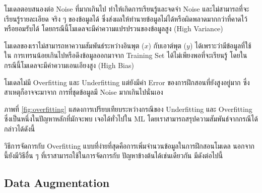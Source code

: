 \begin{description}[style=nextline]
    \item[Overfitting] โมเดลตอบสนองต่อ Noise ที่มากเกินไป ทำให้เกิดการเรียนรู้และจดจำ Noise และไม่สามารถที่จะเรียนรู้รายละเอียด%
    จริง ๆ ของข้อมูลได้ ซึ่งส่งผลให้ทำนายข้อมูลไม่ได้หรือผิดพลาดมากกว่าที่คาดไว้หรือยอมรับได้ โดยกรณีนี้โมเดลจะมีค่าความแปรปรวนของข้อมูลสูง 
    (High Variance)
    
    \item[Underfitting] โมเดลของเราไม่สามารถหาความสัมพันธ์ระหว่างอินพุต ($x$) กับเอาต์พุต ($y$) ได้เพราะว่ามีข้อมูลที่ใช้ใน%
    การเทรนน้อยเกินไปหรือดึงข้อมูลออกมาจาก Training Set ได้ไม่เพียงพอที่จะเรียนรู้ โดยในกรณีนี้โมเดลจะมีค่าความเอนเอียงสูง (High Bias)

    \item[Noisy] โมเดลไม่มี Overfitting และ Underfitting แต่ยังมีค่า Error ของการฝึกสอนที่ยังสูงอยู่มาก ซึ่งสาเหตุก็อาจจะมาจาก%
    การที่ชุดข้อมูลมี Noise มากเกินไปนั่นเอง
\end{description}

ภาพที่ \ref{fig:overfitting} แสดงการเปรียบเทียบระหว่างกรณีของ Underfitting และ Overfitting ซึ่งเป็นหนึ่งในปัญหาหลักที่มักจะพบ%
เจอได้ทั่วไปใน ML โดยเราสามารถสรุปความสัมพันธ์จากกรณีได้กล่าวได้ดังนี้


วิธีการจัดการกับ Overfitting แบบที่ง่ายที่สุดคือการเพิ่มจำนวนข้อมูลในการฝึกสอนโมเดล นอกจากนี้ยังมีวิธีอื่น ๆ ที่เราสามารถใช้ในการจัดการกับ%
ปัญหาข้างต้นได้เช่นเดียวกัน มีดังต่อไปนี้

\subsection{Data Augmentation}
\label{ssec:data_aug}

